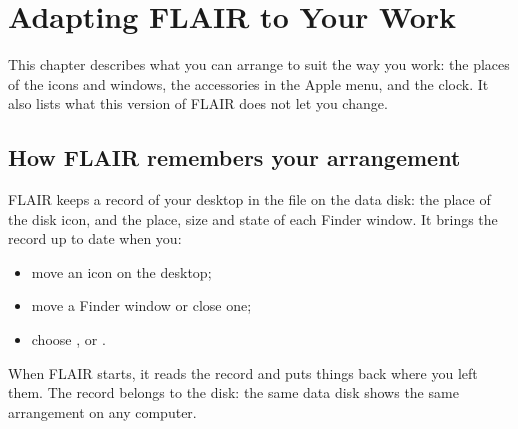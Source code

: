 \chapter{Adapting FLAIR to Your Work}
\label{ch:adapting}

This chapter describes what you can arrange to suit the way you work: the
places of the icons and windows, the accessories in the Apple menu, and the
clock.  It also lists what this version of FLAIR does not let you change.

\section{How FLAIR remembers your arrangement}
FLAIR keeps a record of your desktop in the file  on the
data disk: the place of the disk icon, and the place, size and state of
each Finder window.  It brings the record up to date when you:
\begin{itemize}
\item move an icon on the desktop;
\item move a Finder window or close one;
\item choose ,  or .
\end{itemize}
When FLAIR starts, it reads the record and puts things back where you left
them.  The record belongs to the disk: the same data disk shows the same
arrangement on any computer.

